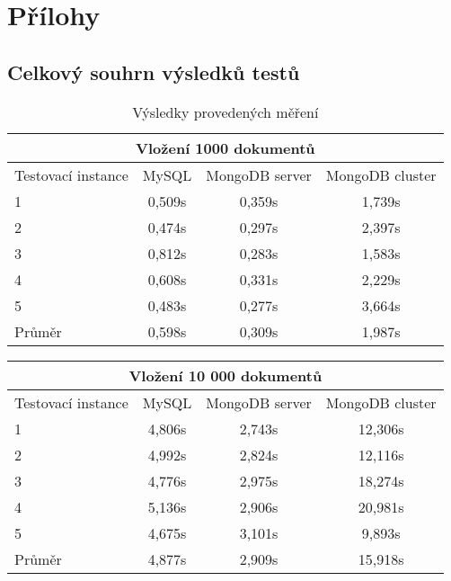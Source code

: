 \appendix
{}\thispagestyle{empty}  \renewcommand{\appendixname}{P\v{r}iloha}%


\part*{Přílohy}


\chapter[\noindent Souhrn výsledků testování]{\noindent Celkový souhrn výsledků testů}
\begin{table}[h]
\centering
\caption{Výsledky provedených měření}
\begin{tabular}{ | l | c | c | c | }
\hline
\multicolumn{4}{|c|}{Vložení 1000 dokumentů} \\ \hline
Testovací instance &MySQL&MongoDB server & MongoDB cluster \\ \hline
1 & 0,509s & 0,359s & 1,739s \\ \hline
2 & 0,474s & 0,297s & 2,397s \\ \hline
3 & 0,812s & 0,283s & 1,583s \\ \hline
4 & 0,608s & 0,331s & 2,229s \\ \hline
5 & 0,483s & 0,277s & 3,664s \\ \hline
Průměr & 0,598s & 0,309s & 1,987s \\ \hline
\end{tabular}
\end{table}

\begin{table}[h]
\centering
\begin{tabular}{ | l | c | c | c | }
\hline
\multicolumn{4}{|c|}{Vložení 10 000 dokumentů} \\ \hline
Testovací instance &MySQL&MongoDB server & MongoDB cluster \\ \hline
1 & 4,806s & 2,743s & 12,306s \\ \hline
2 & 4,992s & 2,824s & 12,116s \\ \hline
3 & 4,776s & 2,975s & 18,274s \\ \hline
4 & 5,136s & 2,906s & 20,981s \\ \hline
5 & 4,675s & 3,101s & 9,893s \\ \hline                                                                
Průměr & 4,877s & 2,909s & 15,918s\\ \hline
\end{tabular}
\end{table}

